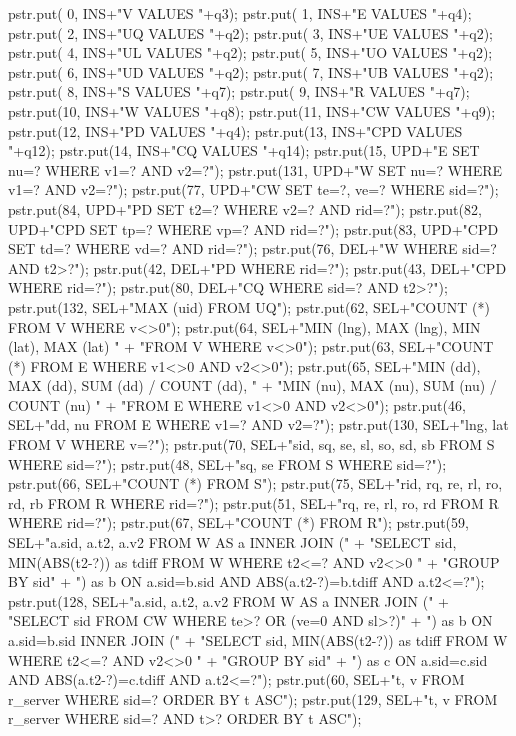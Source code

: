 \documentclass{article}
\theoremstyle{definition}
\begin{document}
  pstr.put( 0, INS+"V VALUES "+q3);
  pstr.put( 1, INS+"E VALUES "+q4);
  pstr.put( 2, INS+"UQ VALUES "+q2);
  pstr.put( 3, INS+"UE VALUES "+q2);
  pstr.put( 4, INS+"UL VALUES "+q2);
  pstr.put( 5, INS+"UO VALUES "+q2);
  pstr.put( 6, INS+"UD VALUES "+q2);
  pstr.put( 7, INS+"UB VALUES "+q2);
  pstr.put( 8, INS+"S VALUES "+q7);
  pstr.put( 9, INS+"R VALUES "+q7);
  pstr.put(10, INS+"W VALUES "+q8);
  pstr.put(11, INS+"CW VALUES "+q9);
  pstr.put(12, INS+"PD VALUES "+q4);
  pstr.put(13, INS+"CPD VALUES "+q12);
  pstr.put(14, INS+"CQ VALUES "+q14);
  pstr.put(15, UPD+"E SET nu=? WHERE v1=? AND v2=?");
  pstr.put(131, UPD+"W SET nu=? WHERE v1=? AND v2=?");
  pstr.put(77, UPD+"CW SET te=?, ve=? WHERE sid=?");
  pstr.put(84, UPD+"PD SET t2=? WHERE v2=? AND rid=?");
  pstr.put(82, UPD+"CPD SET tp=? WHERE vp=? AND rid=?");
  pstr.put(83, UPD+"CPD SET td=? WHERE vd=? AND rid=?");
  pstr.put(76, DEL+"W WHERE sid=? AND t2>?");
  pstr.put(42, DEL+"PD WHERE rid=?");
  pstr.put(43, DEL+"CPD WHERE rid=?");
  pstr.put(80, DEL+"CQ WHERE sid=? AND t2>?");
  pstr.put(132, SEL+"MAX (uid) FROM UQ");
  pstr.put(62, SEL+"COUNT (*) FROM V WHERE v<>0");
  pstr.put(64, SEL+"MIN (lng), MAX (lng), MIN (lat), MAX (lat) "
      + "FROM V WHERE v<>0");
  pstr.put(63, SEL+"COUNT (*) FROM E WHERE v1<>0 AND v2<>0");
  pstr.put(65, SEL+"MIN (dd), MAX (dd), SUM (dd) / COUNT (dd), "
      + "MIN (nu), MAX (nu), SUM (nu) / COUNT (nu) "
      + "FROM E WHERE v1<>0 AND v2<>0");
  pstr.put(46, SEL+"dd, nu FROM E WHERE v1=? AND v2=?");
  pstr.put(130, SEL+"lng, lat FROM V WHERE v=?");
  pstr.put(70, SEL+"sid, sq, se, sl, so, sd, sb FROM S WHERE sid=?");
  pstr.put(48, SEL+"sq, se FROM S WHERE sid=?");
  pstr.put(66, SEL+"COUNT (*) FROM S");
  pstr.put(75, SEL+"rid, rq, re, rl, ro, rd, rb FROM R WHERE rid=?");
  pstr.put(51, SEL+"rq, re, rl, ro, rd FROM R WHERE rid=?");
  pstr.put(67, SEL+"COUNT (*) FROM R");
  pstr.put(59, SEL+"a.sid, a.t2, a.v2 FROM W AS a INNER JOIN ("
      + "SELECT sid, MIN(ABS(t2-?)) as tdiff FROM W WHERE t2<=? AND v2<>0 "
      + "GROUP BY sid"
      + ") as b ON a.sid=b.sid AND ABS(a.t2-?)=b.tdiff AND a.t2<=?");
  pstr.put(128, SEL+"a.sid, a.t2, a.v2 FROM W AS a INNER JOIN ("
      + "SELECT sid FROM CW WHERE te>? OR (ve=0 AND sl>?)"
      + ") as b ON a.sid=b.sid INNER JOIN ("
      + "SELECT sid, MIN(ABS(t2-?)) as tdiff FROM W WHERE t2<=? AND v2<>0 "
      + "GROUP BY sid"
      + ") as c ON a.sid=c.sid AND ABS(a.t2-?)=c.tdiff AND a.t2<=?");
  pstr.put(60, SEL+"t, v FROM r_server WHERE sid=? ORDER BY t ASC");
  pstr.put(129, SEL+"t, v FROM r_server WHERE sid=? AND t>? ORDER BY t ASC");
\end{document}
